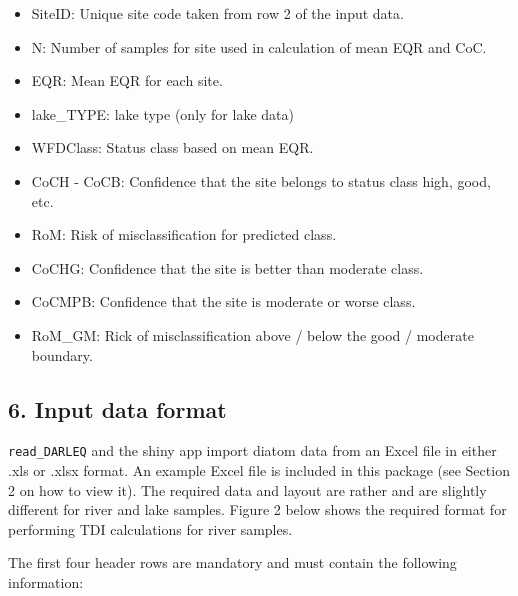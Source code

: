 \documentclass[
]{article}
\begin{document}
\begin{itemize}
\item
  SiteID: Unique site code taken from row 2 of the input data.
\item
  N: Number of samples for site used in calculation of mean EQR and CoC.
\item
  EQR: Mean EQR for each site.
\item
  lake\_TYPE: lake type (only for lake data)
\item
  WFDClass: Status class based on mean EQR.
\item
  CoCH - CoCB: Confidence that the site belongs to status class high,
  good, etc.
\item
  RoM: Risk of misclassification for predicted class.
\item
  CoCHG: Confidence that the site is better than moderate class.
\item
  CoCMPB: Confidence that the site is moderate or worse class.
\item
  RoM\_GM: Rick of misclassification above / below the good / moderate
  boundary.
\end{itemize}

\hypertarget{input-data-format}{%
\subsection{6. Input data format}\label{input-data-format}}

\texttt{read\_DARLEQ} and the shiny app import diatom data from an Excel
file in either .xls or .xlsx format. An example Excel file is included
in this package (see Section 2 on how to view it). The required data and
layout are rather and are slightly different for river and lake samples.
Figure 2 below shows the required format for performing TDI calculations
for river samples.

The first four header rows are mandatory and must contain the following
information:
\end{document}
